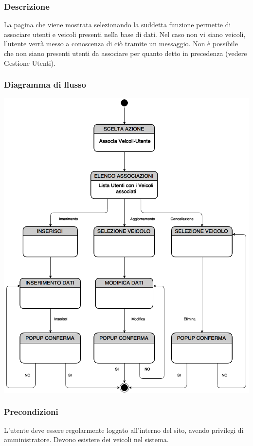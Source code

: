 \documentclass[a4paper,12pt]{article}
\begin{document}
\subsubsection{Descrizione}
La pagina che viene mostrata selezionando la suddetta funzione permette di associare utenti e veicoli presenti nella base di dati. Nel caso non vi siano veicoli, l'utente verrà messo a conoscenza di ciò tramite un messaggio. Non è possibile che non siano presenti utenti da associare per quanto detto in precedenza (vedere Gestione Utenti).
\subsubsection{Diagramma di flusso}

\begin{center}
\includegraphics[scale=0.45]{Associa.png}
\end{center}
\subsubsection{Precondizioni}
L'utente deve essere regolarmente loggato all'interno del sito, avendo privilegi di amministratore. Devono esistere dei veicoli nel sistema.
\end{document}
